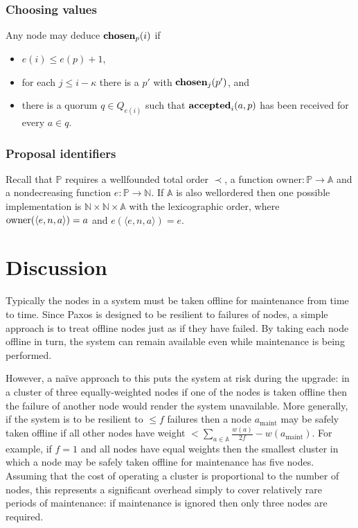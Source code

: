 \documentclass[journal]{IEEEtran}
\begin{document}
\subsubsection{Choosing values} Any node may deduce $\mathbf{chosen}_{p}(i)$ if
\begin{itemize} \item $e(i) \le e(p) + 1$, \item for each $j \le i - \kappa$
there is a $p'$ with $\mathbf{chosen}_{j}(p')$, and \item there is a quorum $q \in
Q_{e(i)}$ such that $\mathbf{accepted}_{i}(a,p)$ has been received for every $a \in q$.
\end{itemize}

\subsubsection{Proposal identifiers} Recall that $\mathbb P$ requires a
wellfounded total order $\prec$, a function $\mathrm{owner} : \mathbb P \to
\mathbb A$ and a nondecreasing function $e : \mathbb P \to \mathbb N$. If
$\mathbb A$ is also wellordered then one possible implementation is $\mathbb N
\times \mathbb N \times \mathbb A$ with the lexicographic order, where
$\mathrm{owner}(\langle e, n, a \rangle) = a$ and $e(\langle e, n, a\rangle) = e$.

\section{Discussion}\label{discussion}

Typically the nodes in a system must be taken offline for maintenance from time
to time. Since Paxos is designed to be resilient to failures of nodes, a simple
approach is to treat offline nodes just as if they have failed. By taking each
node offline in turn, the system can remain available even while maintenance is
being performed.

However, a na\"ive approach to this puts the system at risk during the upgrade:
in a cluster of three equally-weighted nodes if one of the nodes is taken
offline then the failure of another node would render the system unavailable.
More generally, if the system is to be resilient to $\le f$ failures then a
node $a_{\textrm{maint}}$ may be safely taken offline if all other nodes have
weight $< \sum_{a \in \mathbb A} \frac{w(a)}{2f} - w(a_{\textrm{maint}})$. For
example, if $f = 1$ and all nodes have equal weights then the smallest cluster
in which a node may be safely taken offline for maintenance has five nodes.
Assuming that the cost of operating a cluster is proportional to the number of
nodes, this represents a significant overhead simply to cover relatively rare
periods of maintenance: if maintenance is ignored then only three nodes are
required.
\end{document}
